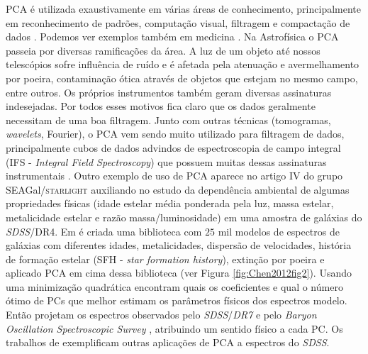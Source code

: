 \documentclass[a4paper,12pt]{article}
\def\starlight{\textsc{starlight}\xspace}      %
\def\SDSS{\textit{SDSS}\xspace}           %
\begin{document}
PCA é utilizada exaustivamente em várias áreas de conhecimento, principalmente em reconhecimento de padrões, computação visual, filtragem e
compactação de dados \citep{Kamruzzaman2010, Borcea2012}. Podemos ver exemplos também em medicina \citep{Balakrishnan2013}. Na Astrofísica o PCA
passeia por diversas ramificações da área. A luz de um objeto até nossos telescópios sofre influência de ruído e é afetada pela atenuação e
avermelhamento por poeira, contaminação ótica através de objetos que estejam no mesmo campo, entre outros. Os próprios instrumentos também geram
diversas assinaturas indesejadas. Por todos esses motivos fica claro que os dados geralmente necessitam de uma boa filtragem. Junto com outras
técnicas (tomogramas, {\em wavelets}, Fourier), o PCA vem sendo muito utilizado para filtragem de dados, principalmente cubos de dados advindos de
espectroscopia de campo integral (IFS - {\em Integral Field Spectroscopy}) que possuem muitas dessas assinaturas instrumentais \citep{Riffel2011}.
Outro exemplo de uso de PCA aparece no artigo IV do grupo SEAGal/\starlight \citep{Mateus2007} auxiliando no estudo da dependência ambiental de
algumas propriedades físicas (idade estelar média ponderada pela luz, massa estelar, metalicidade estelar e razão massa/luminosidade) em uma amostra
de galáxias do \SDSS/DR4. Em \citet{Chen2012} é criada uma biblioteca com $25$ mil modelos de espectros de galáxias com diferentes idades,
metalicidades, dispersão de velocidades, história de formação estelar (SFH - {\em star formation history}), extinção por poeira e aplicado PCA em cima
dessa biblioteca (ver Figura \ref{fig:Chen2012fig2}). Usando uma minimização quadrática encontram quais os coeficientes e qual o número ótimo de PCs
que melhor estimam os parâmetros físicos dos espectros modelo. Então projetam os espectros observados pelo \SDSS/{\em DR7} \citep{Abazajian2009} e
pelo {\em Baryon Oscillation Spectroscopic Survey} \citep[BOSS;][]{Ahn2012}, atribuindo um sentido físico a cada PC. Os trabalhos de
\citet{Ferreras2006, Wild2006, Rogers2007} exemplificam outras aplicações de PCA a espectros do \SDSS.
\end{document}
